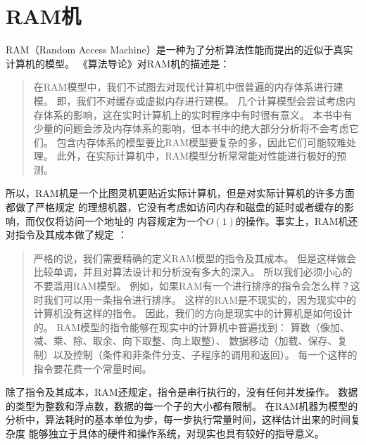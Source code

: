 \section{RAM机}
RAM（Random Access Machine）是一种为了分析算法性能而提出的近似于真实计算机的模型。
《算法导论》\cite{DBLP:books/daglib/0023376}对RAM机的描述是：
\begin{quotation}
        在RAM模型中，我们不试图去对现代计算机中很普遍的内存体系进行建模。
        即，我们不对缓存或虚拟内存进行建模。
        几个计算模型会尝试考虑内存体系的影响，这在实时计算机上的实时程序中有时很有意义。
        本书中有少量的问题会涉及内存体系的影响，但本书中的绝大部分分析将不会考虑它们。
        包含内存体系的模型要比RAM模型要复杂的多，因此它们可能较难处理。
        此外，在实际计算机中，RAM模型分析常常能对性能进行极好的预测。
\end{quotation}
所以，RAM机是一个比图灵机更贴近实际计算机，但是对实际计算机的许多方面都做了严格规定
的理想机器，它没有考虑如访问内存和磁盘的延时或者缓存的影响，而仅仅将访问一个地址的
内容规定为一个$O(1)$的操作。事实上，RAM机还对指令及其成本做了规定
\cite{DBLP:books/daglib/0023376}：
\begin{quotation}
        严格的说，我们需要精确的定义RAM模型的指令及其成本。
        但是这样做会比较单调，并且对算法设计和分析没有多大的深入。
        所以我们必须小心的不要滥用RAM模型。
        例如，如果RAM有一个进行排序的指令会怎么样？这时我们可以用一条指令进行排序。
        这样的RAM是不现实的，因为现实中的计算机没有这样的指令。
        因此，我们的方向是现实中的计算机是如何设计的。
        RAM模型的指令能够在现实中的计算机中普遍找到：
        算数（像加、减、乘、除、取余、向下取整、向上取整）、
        数据移动（加载、保存、复制）以及控制（条件和非条件分支、子程序的调用和返回）。
        每一个这样的指令要花费一个常量时间。
\end{quotation}
除了指令及其成本，RAM还规定，指令是串行执行的，没有任何并发操作\cite{DBLP:books/daglib/0023376}。
数据的类型为整数和浮点数，数据的每一个子的大小都有限制。
在RAM机器为模型的分析中，算法耗时的基本单位为步，每一步执行常量时间，这样估计出来的时间复杂度
能够独立于具体的硬件和操作系统，对现实也具有较好的指导意义。
